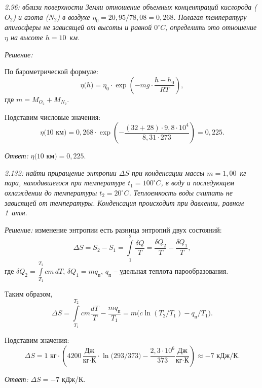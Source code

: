 \documentclass[pscyr]{hedsemwork}
\begin{document}
\newpage %

\emph{2.96: вблизи поверхности Земли отношение объемных концентраций кислорода
(\( O_2 \)) и азота (\( N_2 \)) в воздухе \( \eta_0 = 20,\!95/78,\!08 =
0,\!268 \). Полагая температуру атмосферы не зависящей от высоты и равной
\( 0^\circ C \), определить это отношение \( \eta \) на высоте \( h = 10 \)~км.}

\vspace*{2em}
\emph{Решение:}

По барометрической формуле:
\[
  \eta\big(h\big) = \eta_0\cdot\exp\left(-mg\cdot\frac{h - h_0}{RT}\right),
\]
где \( m = M_{O_2} + M_{N_2} \).

Подставим числовые значения:
\[
  \eta\big(10\text{ км}\big) = 0,\!268\cdot\exp\left(-\frac{(32 + 28)\cdot
  9,\!8\cdot10^{4}}{8,\!31\cdot273}\right) = 0,\!225.
\]

\vspace*{2em}
\emph{Ответ:} \( \eta\big(10\text{ км}\big) = 0,\!225 \).

\newpage %

\emph{2.132: найти приращение энтропии \( \Delta S \) при конденсации массы
\( m = 1,\!00 \)~кг пара, находившегося при температуре \( t_1 = 100^\circ C \),
в воду и последующем охлаждении до температуры \( t_2 = 20^\circ C \).
Теплоемкость воды считать не зависящей от температуры. Конденсация происходит
при давлении, равном 1~атм.}

\vspace*{2em}
\emph{Решение:}
изменение энтропии есть разница энтропий двух состояний:
\[
  \Delta S = S_2 - S_1 = \int\limits_1^2 \frac{\delta Q}{T} =
  \frac{\delta Q_2}{T} - \frac{\delta Q_1}{T},
\]
где \( \displaystyle \delta Q_2 = \int\limits_{T_1}^{T_2} cm\,dT \), \quad
\( \delta Q_1 = mq_\text{п} \), \( q_\text{п} \) -- удельная теплота парообразования.

Таким образом,
\[
  \Delta S = \int\limits_{T_1}^{T_2} cm\frac{dT}{T} - \frac{mq_\text{п}}{T_1} =
  m\big(c\ln(T_2/T_1) - q_\text{п}/T_1\big).
\]

Подставим значения:
\[
  \Delta S = 1\text{ кг}\cdot\left(4200\,\frac{\text{Дж}}{\text{кг}\cdot\text{К}}
  \cdot\ln\big(293/373\big) - \frac{2,\!3\cdot 10^6}{373}\frac{\text{Дж}}
  {\text{кг}\cdot\text{К}}\right) \approx -7 \text{ кДж}/\text{К}.
\]

\vspace*{2em}
\emph{Ответ:} \( \Delta S = -7 \) кДж/К.
\end{document}
